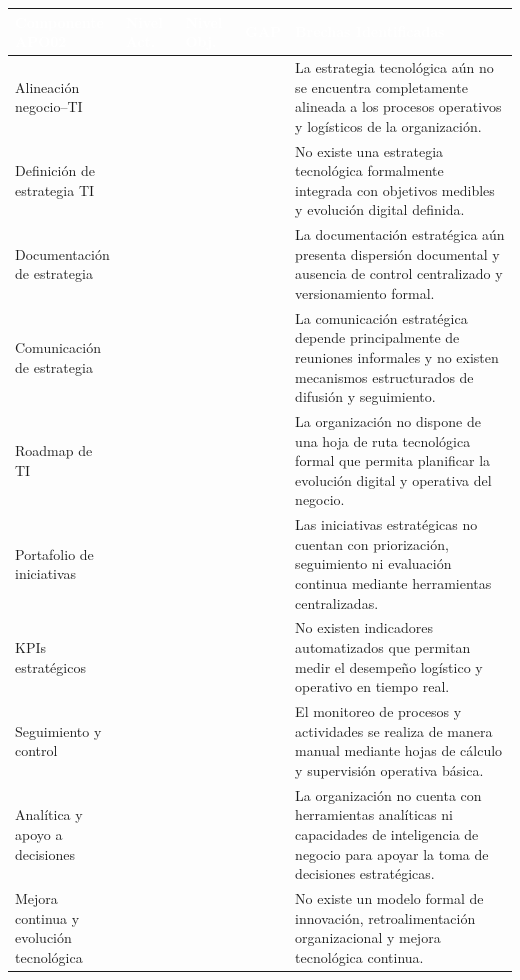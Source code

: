 \documentclass[11pt]{article}
\newcounter{none} %
\begin{document}
\vspace{0.3cm}
\setlength{\tabcolsep}{5pt}
\renewcommand{\arraystretch}{1.5}
{\def\LTcaptype{none}
\begin{longtable}[]{@{}
  >{\centering\arraybackslash}p{0.22\linewidth}
  >{\centering\arraybackslash}p{0.12\linewidth}
  >{\centering\arraybackslash}p{0.12\linewidth}
  >{\centering\arraybackslash}p{0.08\linewidth}
  >{\raggedright\arraybackslash}p{0.46\linewidth}@{}}
\rowcolor{DeepNavy}
\textcolor{white}{\textbf{Componente APO02}} & \textcolor{white}{\textbf{Nivel Act.}} & \textcolor{white}{\textbf{Nivel Obj.}} & \textcolor{white}{\textbf{GAP}} & \textcolor{white}{\textbf{Brechas Identificadas}} \\ \hline
\endhead
\rowcolor{LightGray}
Alineación negocio--TI & 2 & 4 & 2 & La estrategia tecnológica aún no se encuentra completamente alineada a los procesos operativos y logísticos de la organización. \\ \hline
Definición de estrategia TI & 2 & 4 & 2 & No existe una estrategia tecnológica formalmente integrada con objetivos medibles y evolución digital definida. \\ \hline
\rowcolor{LightGray}
Documentación de estrategia & 2 & 4 & 2 & La documentación estratégica aún presenta dispersión documental y ausencia de control centralizado y versionamiento formal. \\ \hline
Comunicación de estrategia & 1 & 3 & 2 & La comunicación estratégica depende principalmente de reuniones informales y no existen mecanismos estructurados de difusión y seguimiento. \\ \hline
\rowcolor{LightGray}
Roadmap de TI & 1 & 4 & 3 & La organización no dispone de una hoja de ruta tecnológica formal que permita planificar la evolución digital y operativa del negocio. \\ \hline
Portafolio de iniciativas & 1 & 4 & 3 & Las iniciativas estratégicas no cuentan con priorización, seguimiento ni evaluación continua mediante herramientas centralizadas. \\ \hline
\rowcolor{LightGray}
KPIs estratégicos & 1 & 4 & 3 & No existen indicadores automatizados que permitan medir el desempeño logístico y operativo en tiempo real. \\ \hline
Seguimiento y control & 1 & 4 & 3 & El monitoreo de procesos y actividades se realiza de manera manual mediante hojas de cálculo y supervisión operativa básica. \\ \hline
\rowcolor{LightGray}
Analítica y apoyo a decisiones & 0 & 4 & 4 & La organización no cuenta con herramientas analíticas ni capacidades de inteligencia de negocio para apoyar la toma de decisiones estratégicas. \\ \hline
Mejora continua y evolución tecnológica & 1 & 5 & 4 & No existe un modelo formal de innovación, retroalimentación organizacional y mejora tecnológica continua. \\ \hline
\end{longtable}
}
\end{document}
